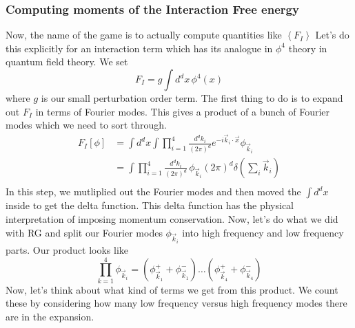 \subsubsection{Computing moments of the Interaction Free energy} 
Now, the name of the game is to actually compute 
quantities like $ \left< F _ I  \right>$
Let's do this explicitly for an interaction 
term which has its analogue in $ \phi ^ 4 $ theory 
in quantum field theory. We set 
\[
	F_ I = g \int d^ d x \, \phi ^ 4 ( x ) 
\] where $ g $ is our small perturbation order term. 
The first thing to do is to expand out 
$ F _ I $ in terms of Fourier modes. 
This gives a product of a bunch of Fourier modes
which we need to sort through.
\begin{align*}
	F_ I [ \phi ] &=  \int d ^ d x \int \prod^ 4 _{ i = 1 }
	\frac{ d ^ d k _ i }{ ( 2 \pi ) ^ d } 
	e ^{ - i \vec{k}_ i \cdot  \vec{x} } \phi _{ \vec{k} _ i } \\
		      &=  \int \prod_{ i = 1 } ^ 4 \frac{d ^ d k _ i }{ ( 2 
		      \pi ) ^ d } \,  
		      \phi _{ \vec{k} _ i } ( 2 \pi ) ^ d 
		      \delta ( \sum _ i \vec{k} _ i ) \\ 
\end{align*}
In this step, we mutliplied out the Fourier modes and then 
moved the $ \int d ^ d x $ inside to get the delta function. 
This delta function has the physical interpretation of 
imposing momentum conservation. Now, 
let's do what we did with RG and split our Fourier modes 
$ \phi_{ \vec{k} _ i}  $ into high frequency and 
low frequency parts. 
Our product looks like 
\[
 \prod_{ k = 1 } ^ 4 \phi_{ \vec{k} _ i } = 
 ( \phi _{ \vec{k}_ 1  }^ + + \phi _{ \vec{k} _ 1 } ^ - ) 
 \dots ( \phi _{ \vec{k} _ 4 } ^ + + \phi_{ \vec{k} _ 4 } ^ - ) 
\] Now, 
let's think about what kind of terms we get from 
this product. We count these by considering how many 
low frequency versus high frequency modes there are 
in the expansion. 

